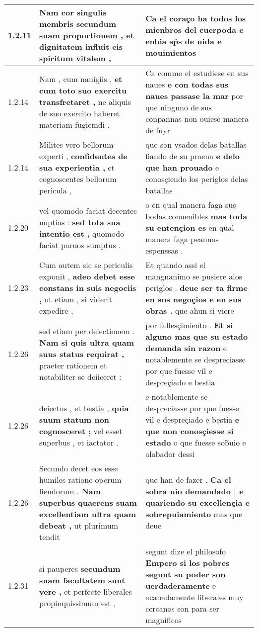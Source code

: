 \begin{tabular}{|p{1cm}|p{6.5cm}|p{6.5cm}|}
1.2.11 & Nam cor singulis membris \textbf{ secundum suam proportionem , } et dignitatem influit eis spiritum vitalem , & Ca el coraço ha todos los mienbros del \textbf{ cuerpoda } e enbia sp̃s de uida e mouimientos \\\hline
1.2.14 & Nam , cum nauigiis , \textbf{ et cum toto suo exercitu transfretaret , } ne aliquis de suo exercito haberet materiam fugiemdi , & Ca commo el estudiese en sus naues \textbf{ e con todas sus naues passase la mar } por que ninguno de sus conpannas non ouiese manera de fuyr \\\hline
1.2.14 & Milites vero bellorum experti , \textbf{ confidentes de sua experientia , } et cognoscentes bellorum pericula , & que son vsados delas batallas fiando de su praeua \textbf{ e delo que han prouado } e conosçiendo los periglos delas batallas \\\hline
1.2.20 & vel quomodo faciat decentes nuptias : \textbf{ sed tota sua intentio est , } quomodo faciat paruos sumptus . & o en qual manera faga sus bodas conuenibles \textbf{ mas toda su entençion es } en qual manera faga peannas espenssas . \\\hline
1.2.23 & Cum autem sic se periculis exponit , \textbf{ adeo debet esse constans in suis negociis , } ut etiam , si viderit expedire , & Et quando assi el mangnanimo se pusiere alos periglos . \textbf{ deue ser ta firme en sus negoçios e en sus obras . } que ahun si viere \\\hline
1.2.26 & sed etiam per deiectionem . \textbf{ Nam si quis ultra quam suus status requirat , } praeter rationem et notabiliter se deiiceret : & por fallesçimiento . \textbf{ Et si alguno mas que su estado demanda sin razon } e notablemente se despreciasse por que fuesse vil e despreçiado e bestia \\\hline
1.2.26 & deiectus , et bestia , \textbf{ quia suum statum non cognosceret ; } vel esset superbus , et iactator . & e notablemente se despreciasse por que fuesse vil e despreçiado e bestia \textbf{ e que non conosçiesse si estado } o que fuesse sob̃uio e alabador dessi \\\hline
1.2.26 & Secundo decet eos esse humiles ratione operum fiendorum . \textbf{ Nam superbus quaerens suam excellentiam ultra quam debeat , } ut plurimum tendit & que han de fazer . \textbf{ Ca el sobra uio demandado | e quariendo su excellençia e sobrepuiamiento } mas que deue \\\hline
1.2.31 & si pauperes \textbf{ secundum suam facultatem sunt vere , } et perfecte liberales propinquissimum est , & segunt dize el philosofo \textbf{ Empero si los pobres segunt su poder son uerdaderamente } e acabadamente liberales muy cercanos son para ser magnificos \\\hline

\end{tabular}
